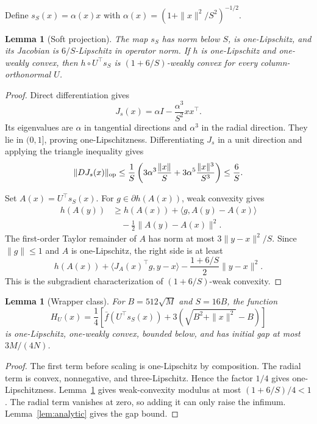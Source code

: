 \documentclass[twoside]{article}
\newtheorem{lemma}[theorem]{Lemma}
\begin{document}
Define $s_S(x)=\alpha(x)x$ with
$\alpha(x)=(1+\|x\|^2/S^2)^{-1/2}$.

\begin{lemma}[Soft projection]
\label{lem:soft}
The map $s_S$ has norm below $S$, is one-Lipschitz, and its Jacobian is
$6/S$-Lipschitz in operator norm. If $h$ is one-Lipschitz and
one-weakly convex, then $h\circ U^\top s_S$ is
$(1+6/S)$-weakly convex for every column-orthonormal $U$.
\end{lemma}

\begin{proof}
Direct differentiation gives
\[
 J_s(x)=\alpha I-\frac{\alpha^3}{S^2}xx^\top.
\]
Its eigenvalues are $\alpha$ in tangential directions and $\alpha^3$ in the
radial direction. They lie in $(0,1]$, proving one-Lipschitzness. Differentiating
$J_s$ in a unit direction and applying the triangle inequality gives
\[
 \|D J_s(x)\|_{\rm op}
 \leq\frac1S\left(3\alpha^3\frac{\|x\|}{S}
 +3\alpha^5\frac{\|x\|^3}{S^3}\right)\leq\frac6S.
\]

Set $A(x)=U^\top s_S(x)$. For $g\in\partial h(A(x))$, weak convexity gives
\begin{align*}
 h(A(y))&\geq h(A(x))+\langle g,A(y)-A(x)\rangle\\
 &\quad-\frac12\|A(y)-A(x)\|^2.
\end{align*}
The first-order Taylor remainder of $A$ has norm at most
$3\|y-x\|^2/S$. Since $\|g\|\leq1$ and $A$ is one-Lipschitz, the right side
is at least
\[
 h(A(x))+\langle J_A(x)^\top g,y-x\rangle
 -\frac{1+6/S}{2}\|y-x\|^2.
\]
This is the subgradient characterization of $(1+6/S)$-weak convexity.
\end{proof}

\begin{lemma}[Wrapper class]
\label{lem:wrapper-class}
For $B=512\sqrt M$ and $S=16B$, the function
\[
 H_U(x)=\frac14\left[\bar f(U^\top s_S(x))
 +3(\sqrt{B^2+\|x\|^2}-B)\right]
\]
is one-Lipschitz, one-weakly convex, bounded below, and has initial gap at
most $3M/(4N)$.
\end{lemma}

\begin{proof}
The first term before scaling is one-Lipschitz by composition. The radial
term is convex, nonnegative, and three-Lipschitz. Hence the factor $1/4$
gives one-Lipschitzness. Lemma~\ref{lem:soft} gives weak-convexity modulus
at most $(1+6/S)/4<1$. The radial term vanishes at zero, so adding it can
only raise the infimum. Lemma~\ref{lem:analytic} gives the gap bound.
\end{proof}
\end{document}
